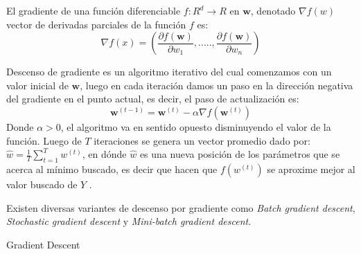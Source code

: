 El gradiente de una función diferenciable $ f: R^d \longrightarrow R $ en $\textbf{w}$, denotado $ \nabla f(w) $ vector de derivadas parciales de la función $f$ es:
\begin{equation}
\nabla f(x) = (\frac{\partial f(\textbf{w})}{\partial w_1},....., \frac{\partial f(\textbf{w})}{\partial w_n})
\end{equation}

Descenso de gradiente es un algoritmo iterativo del cual comenzamos con un valor inicial de $\textbf{w}$, luego en cada iteración damos un paso en la dirección negativa del gradiente en el punto actual, es decir, el paso de actualización es:
\begin{equation}
\textbf{w}^{(t-1)} = \textbf{w}^{(t)} - \alpha \nabla f(\textbf{w}^{(t)})
\end{equation}
Donde $ \alpha > 0$,  el algoritmo va en sentido opuesto disminuyendo el valor de la función. Luego de $T$ iteraciones se genera un vector promedio dado por: $ \hat{w} = \frac{1}{T} \sum_{t=1}^T w^{(t)}$, en dónde $\hat{w}$ es una nueva posición de los parámetros que se acerca al mínimo buscado, es decir que hacen que $f(w^{(t)})$ se aproxime mejor al valor buscado de $Y$ . 

Existen diversas variantes de descenso por gradiente como \textit{Batch gradient descent}, \textit{Stochastic gradient descent} y \textit{Mini-batch gradient descent}.


\begin{algorithm}[H]
\caption{Gradient Descent}\label{euclid}
\begin{algorithmic}[1]

\State $\textbf{INPUT} \gets (X, Y, \theta,iteraciones, \alpha)$
\State $\textbf{OUTPUT} \gets \theta $
\State \textbf{i} = 0
\While {\textbf{i} <  iteraciones}{
\State i++
\State	error = \textit{Función\_Costo}(X, Y, \theta)

\If {error < min\_error}
	\State	break
\Else
	\State \texttt{\theta_{j} := \theta_{j} - \alpha \frac{\partial}{\partial \theta} J(\theta_{1}, \theta_{0})}
	
\EndIf
\EndWhile
\end{algorithmic}
\end{algorithm}



